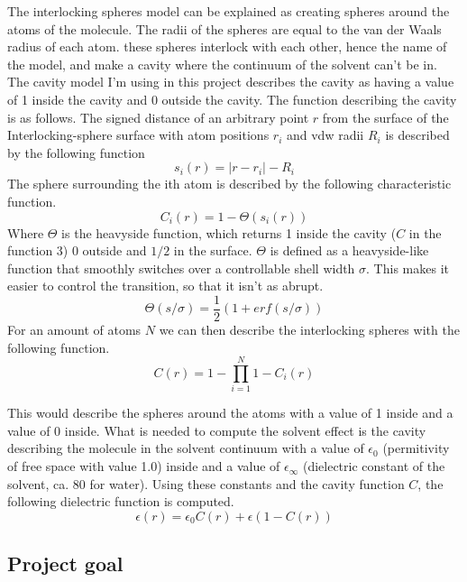 \documentclass[a4paper,11pt]{article}
\begin{document}
The interlocking spheres model can be explained as creating spheres around the atoms of the molecule. The radii of the spheres are equal to the van der Waals radius of each atom. these spheres interlock with each other, hence the name of the model, and make a cavity where the continuum of the solvent can't be in. 
The cavity model I'm using in this project describes the cavity as having a value of 1 inside the cavity and 0 outside the cavity. The function describing the cavity is as follows.
The signed distance of an arbitrary point $r$ from the surface of the Interlocking-sphere surface with atom positions $r_i$ and \ac{vdw} radii $R_i$ is described by the following function
\begin{equation}
s_i(r) = \vert r - r_i\vert - R_i
\end{equation}
The sphere surrounding the ith atom is described by the following characteristic function.
\begin{equation}
C_i(r) = 1 - \Theta (s_i(r)) 
\end{equation}
Where $\Theta$ is the heavyside function, which returns 1 inside the cavity ($C$ in the function 3) 0 outside and $1/2$ in the surface. $\Theta$ is defined as a heavyside-like function that smoothly switches over a controllable shell width $\sigma$. This makes it easier to control the transition, so that it isn't as abrupt.
\begin{equation}
\Theta (s/\sigma) = \frac{1}{2} (1 + erf(s/\sigma))
\end{equation}
For an amount of atoms $N$ we can then describe the interlocking spheres with the following function.
\begin{equation}
C(r) = 1 - \prod_{i=1}^{N} 1 - C_i (r)
\end{equation}

This would describe the spheres around the atoms with a value of 1 inside and a value of 0 inside. What is needed to compute the solvent effect is the cavity describing the molecule in the solvent continuum with a value of $\epsilon_0$ (permitivity of free space with value 1.0) inside and a value of $\epsilon_\infty$ (dielectric constant of the solvent, ca. 80 for water). Using these constants and the cavity function $C$, the following dielectric function is computed.
\begin{equation}
\epsilon (r) = \epsilon_0 C(r) + \epsilon (1 - C(r))
\end{equation}


\subsection{Project goal}
\end{document}

